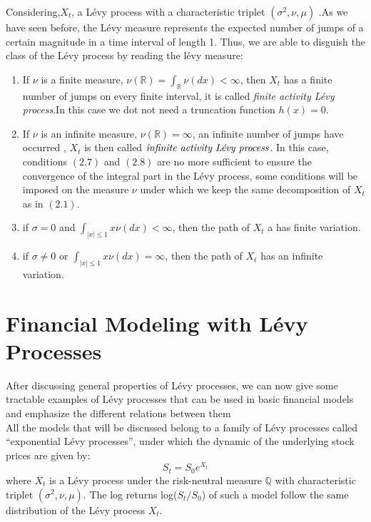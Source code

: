 \documentclass[12pt]{report}
\begin{document}
Considering,$X_t$, a Lévy process with a characteristic triplet $(\sigma^2,\nu, \mu)$ .As we have seen before, the Lévy measure represents the expected number of
jumps of a certain magnitude in a time interval of length 1. Thus, we are able to disguish the class of the Lévy process by reading the lévy measure:
\begin{enumerate}

\item If $\nu$ is a finite
measure,  $\nu(\mathbb{R})= \int_{\mathbb{R}} \nu(dx) < \infty$, then $X_t$ has a finite number of jumps on every finite interval, it is called \emph{finite activity Lévy process}.In this case we dot not need a truncation function $h(x)=0 $.

\item If $\nu$ is an infinite
measure, $\nu(\mathbb{R})=\infty $, an infinite number of jumps have occurred , $X_t$ is then called $\emph{infinite activity Lévy process}$. In this case, conditions $(2.7)$ and $(2.8)$ are no more sufficient to ensure the convergence of the integral part in the Lévy process, some conditions will be imposed on the measure $\nu$ under which we keep the same decomposition of $X_t$ as in $(2.1)$. 

\item if $\sigma = 0$ and $\int_{\mid x\mid
\leqslant1} x\nu(dx) < \infty $, then the path of $X_t$ a has finite variation.
\item if $\sigma \neq 0$ or $\int_{\mid
x\mid
\leqslant
1} x\nu(dx) = \infty $, then the
path of $X_t$ has an infinite variation.
\end{enumerate}
\chapter{ Financial Modeling with Lévy Processes }

After discussing general properties of Lévy processes, we can now give some tractable examples of Lévy processes that can be used in basic financial models and emphasize the different relations between them\\
All the models that will be discussed belong to a family of Lévy processes called “exponential Lévy processes”, under which the dynamic of the underlying stock prices are given by: 
\begin{equation}
S_t= S_0e^{X_t}
\end{equation}
where $X_t$ is a Lévy process under the risk-neutral measure  $\mathbb{Q}$ with
characteristic triplet $(\sigma^2,\nu, \mu)$.
 The log returns log($S_{t}/S_0$) of such a model
follow the same distribution of the Lévy process $X_t$.
\end{document}

